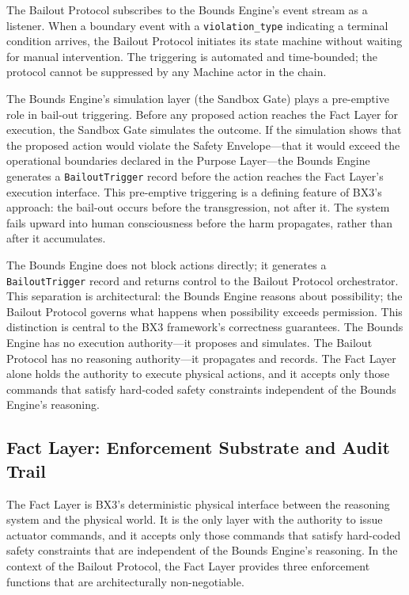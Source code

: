 The Bailout Protocol subscribes to the Bounds Engine's event stream as a listener. When a boundary event with a \texttt{violation\_type} indicating a terminal condition arrives, the Bailout Protocol initiates its state machine without waiting for manual intervention. The triggering is automated and time-bounded; the protocol cannot be suppressed by any Machine actor in the chain.

The Bounds Engine's simulation layer (the Sandbox Gate) plays a pre-emptive role in bail-out triggering. Before any proposed action reaches the Fact Layer for execution, the Sandbox Gate simulates the outcome. If the simulation shows that the proposed action would violate the Safety Envelope---that it would exceed the operational boundaries declared in the Purpose Layer---the Bounds Engine generates a \texttt{BailoutTrigger} record before the action reaches the Fact Layer's execution interface. This pre-emptive triggering is a defining feature of BX3's approach: the bail-out occurs before the transgression, not after it. The system fails upward into human consciousness before the harm propagates, rather than after it accumulates.

The Bounds Engine does not block actions directly; it generates a \texttt{BailoutTrigger} record and returns control to the Bailout Protocol orchestrator. This separation is architectural: the Bounds Engine reasons about possibility; the Bailout Protocol governs what happens when possibility exceeds permission. This distinction is central to the BX3 framework's correctness guarantees. The Bounds Engine has no execution authority---it proposes and simulates. The Bailout Protocol has no reasoning authority---it propagates and records. The Fact Layer alone holds the authority to execute physical actions, and it accepts only those commands that satisfy hard-coded safety constraints independent of the Bounds Engine's reasoning.

\subsection{Fact Layer: Enforcement Substrate and Audit Trail}
\label{sec:fact-layer-audit-trail}

The Fact Layer is BX3's deterministic physical interface between the reasoning system and the physical world. It is the only layer with the authority to issue actuator commands, and it accepts only those commands that satisfy hard-coded safety constraints that are independent of the Bounds Engine's reasoning. In the context of the Bailout Protocol, the Fact Layer provides three enforcement functions that are architecturally non-negotiable.


